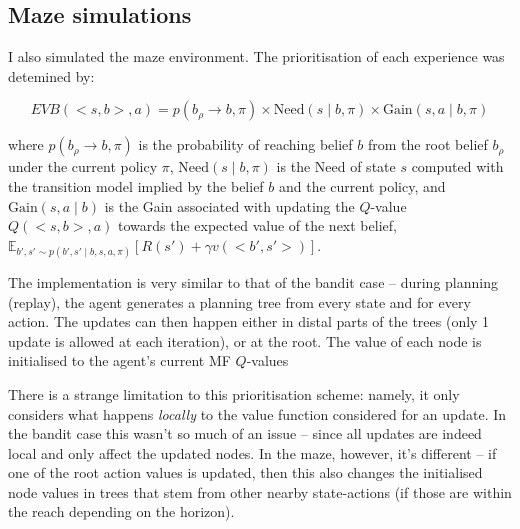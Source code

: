 \documentclass{article}
\begin{document}
\newpage

\subsection*{Maze simulations}

I also simulated the maze environment. The prioritisation of each experience was detemined by:

\begin{equation*}
    EVB(<s, b>, a) = p(b_{\rho} \rightarrow b, \pi) \times \text{Need}(s \mid b, \pi) \times \text{Gain}(s, a \mid b, \pi)
\end{equation*}

where $p(b_{\rho} \rightarrow b, \pi)$ is the probability of reaching belief $b$ from the root belief $b_{\rho}$ under the current 
policy $\pi$, $\text{Need}(s \mid b, \pi)$ is the Need of state $s$ computed with the transition model implied by the belief $b$ and 
the current policy, and $\text{Gain}(s, a \mid b)$ is the Gain associated with updating the $Q$-value $Q(<s, b>, a)$ towards the 
expected value of the next belief, $\mathbb{E}_{b', s' \sim p(b', s'\mid b, s, a, \pi)}[R(s') + \gamma v(<b', s'>)]$.

\bigbreak

The implementation is very similar to that of the bandit case -- during planning (replay), the agent generates a planning tree 
from every state and for every action. The updates can then happen either in distal parts of the trees (only 1 update is allowed 
at each iteration), or at the root. The value of each node is initialised to the agent's current MF $Q$-values

\bigbreak

There is a strange limitation to this prioritisation scheme: namely, it only considers what happens \emph{locally} to the 
value function considered for an update. In the bandit case this wasn't so much of an issue -- since all updates are indeed 
local and only affect the updated nodes. In the maze, however, it's different -- if one of the root action values is updated, 
then this also changes the initialised node values in trees that stem from other nearby state-actions (if those are within the 
reach depending on the horizon). 
\end{document}
